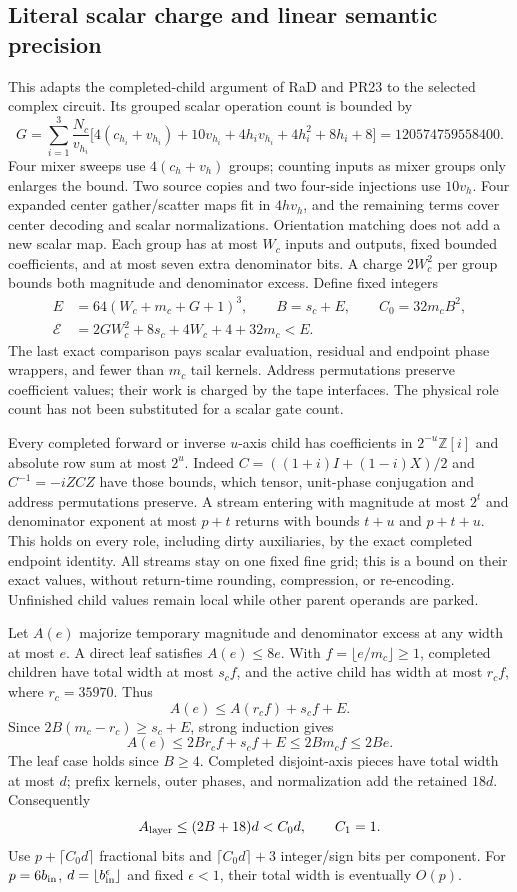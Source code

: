 \subsection{Literal scalar charge and linear semantic precision}
This adapts the completed-child argument of RaD and PR23
\cite{rad,pr23} to the selected complex circuit. Its grouped scalar
operation count is bounded by
\[
 G=\sum_{i=1}^3\frac{N_c}{v_{h_i}}
 \bigl[4(c_{h_i}+v_{h_i})+10v_{h_i}+4h_iv_{h_i}
                         +4h_i^2+8h_i+8\bigr]
   =120574759558400.
\]
Four mixer sweeps use $4(c_h+v_h)$ groups; counting inputs as mixer
groups only enlarges the bound. Two source copies and two four-side
injections use $10v_h$. Four expanded center gather/scatter maps fit
in $4hv_h$, and the remaining terms cover center decoding and scalar
normalizations. Orientation matching does not add a new scalar map.
Each group has at most $W_c$ inputs and outputs, fixed bounded
coefficients, and at most seven extra denominator bits. A charge
$2W_c^2$ per group bounds both magnitude and denominator excess.
Define fixed integers
\[
\begin{aligned}
 E&=64(W_c+m_c+G+1)^3,\qquad B=s_c+E,\qquad C_0=32m_cB^2,\\
 \mathcal E&=2GW_c^2+8s_c+4W_c+4+32m_c<E.
\end{aligned}
\]
The last exact comparison pays scalar evaluation, residual and endpoint
phase wrappers, and fewer than $m_c$ tail kernels. Address permutations
preserve coefficient values; their work is charged by the tape interfaces.
The physical role count has not been substituted for a scalar gate count.

Every completed forward or inverse $u$-axis child has coefficients in
$2^{-u}\mathbb Z[i]$ and absolute row sum at most $2^u$.
Indeed $C=((1+i)I+(1-i)X)/2$ and $C^{-1}=-iZCZ$ have those
bounds, which tensor, unit-phase conjugation and address permutations
preserve. A stream entering with magnitude at most $2^t$ and denominator
exponent at most $p+t$ returns with bounds $t+u$ and $p+t+u$.
This holds on every role, including dirty auxiliaries, by the exact
completed endpoint identity. All streams stay on one fixed fine grid;
this is a bound on their exact values, without return-time rounding,
compression, or re-encoding. Unfinished child values remain local while
other parent operands are parked.

Let $A(e)$ majorize temporary magnitude and denominator excess at any
width at most $e$. A direct leaf satisfies $A(e)\le8e$.
With $f=\lfloor e/m_c\rfloor\ge1$, completed children have total
width at most $s_cf$, and the active child has width at most $r_cf$,
where $r_c=35970$. Thus
\[
 A(e)\le A(r_cf)+s_cf+E.
\]
Since $2B(m_c-r_c)\ge s_c+E$, strong induction gives
\[
 A(e)\le2Br_cf+s_cf+E\le2Bm_cf\le2Be.
\]
The leaf case holds since $B\ge4$. Completed disjoint-axis pieces
have total width at most $d$; prefix kernels, outer phases, and
normalization add the retained $18d$. Consequently
\[
 A_{\rm layer}\le(2B+18)d<C_0d,\qquad C_1=1.
\]
Use $p+\lceil C_0d\rceil$ fractional bits and
$\lceil C_0d\rceil+3$ integer/sign bits per component. For
$p=6b_{\rm in}$, $d=\lfloor b_{\rm in}^{\epsilon}\rfloor$ and
fixed $\epsilon<1$, their total width is eventually $O(p)$.


